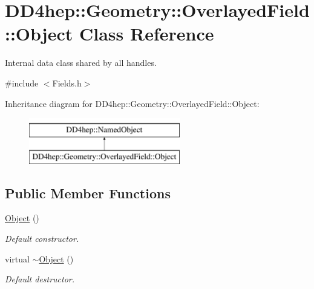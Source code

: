 \hypertarget{class_d_d4hep_1_1_geometry_1_1_overlayed_field_1_1_object}{}\section{D\+D4hep\+:\+:Geometry\+:\+:Overlayed\+Field\+:\+:Object Class Reference}
\label{class_d_d4hep_1_1_geometry_1_1_overlayed_field_1_1_object}


Internal data class shared by all handles.  




{\ttfamily \#include $<$Fields.\+h$>$}

Inheritance diagram for D\+D4hep\+:\+:Geometry\+:\+:Overlayed\+Field\+:\+:Object\+:\begin{figure}[H]
\begin{center}
\leavevmode
\includegraphics[height=2.000000cm]{class_d_d4hep_1_1_geometry_1_1_overlayed_field_1_1_object}
\end{center}
\end{figure}
\subsection*{Public Member Functions}
\begin{DoxyCompactItemize}
\item 
\hyperlink{class_d_d4hep_1_1_geometry_1_1_overlayed_field_1_1_object_a5c62fce5f0a4f429ff6560940cbc94ab}{Object} ()
\begin{DoxyCompactList}\small\item\em Default constructor. \end{DoxyCompactList}\item 
virtual \hyperlink{class_d_d4hep_1_1_geometry_1_1_overlayed_field_1_1_object_ad8d5178e3718579c79f92a4bb740e57d}{$\sim$\+Object} ()
\begin{DoxyCompactList}\small\item\em Default destructor. \end{DoxyCompactList}\end{DoxyCompactItemize}
